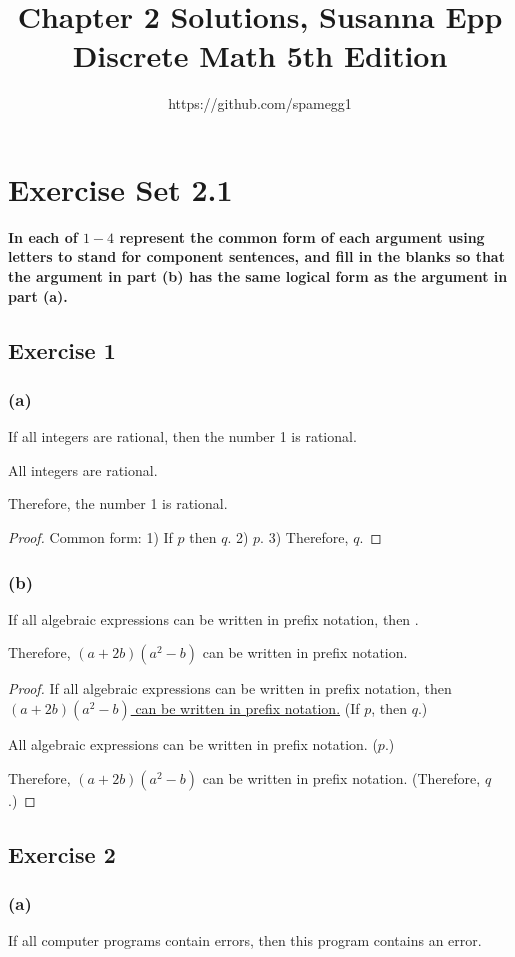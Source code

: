 \documentclass[14pt]{extarticle}
\title{Chapter 2 Solutions, Susanna Epp Discrete Math 5th Edition}
\author{https://github.com/spamegg1}
\begin{document}
 \maketitle \tableofcontents
\section {Exercise Set 2.1} {\bf In each of $1-4$ represent the common form of
each argument using letters to stand for component sentences, and fill in the
blanks so that the argument in part (b) has the same logical form as the
argument in part (a).}

\subsection{Exercise 1} \subsubsection{(a)} If all integers are rational, then
the number 1 is rational.

All integers are rational.

Therefore, the number 1 is rational.

\begin{proof} Common form: 1) If $p$ then $q$. 2) $p$. 3) Therefore, $q$.
\end{proof}

\subsubsection{(b)} If all algebraic expressions can be written in prefix
notation, then \fbl.

Therefore, $(a + 2b)(a^2 - b)$ can be written in prefix notation.

\begin{proof} If all algebraic expressions can be written in prefix notation,
then \\ \underline{$(a + 2b)(a^2 - b)$ can be written in prefix notation.} (If
$p$, then $q$.)

All algebraic expressions can be written in prefix notation. ($p$.)

Therefore, $(a + 2b)(a^2 - b)$ can be written in prefix notation. (Therefore,
$q$.) \end{proof}

\subsection{Exercise 2} \subsubsection{(a)} If all computer programs contain
errors, then this program contains an error.
\end{document}
